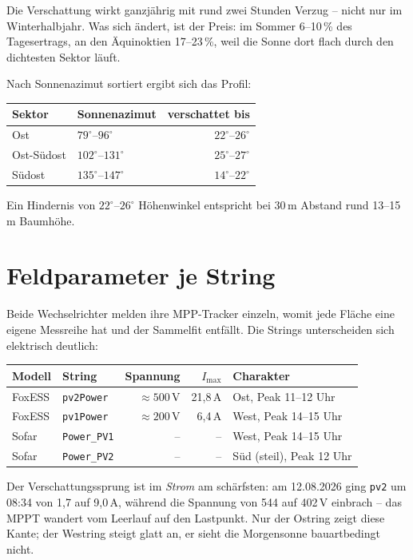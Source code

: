 \documentclass[11pt, a4paper]{article}
\begin{document}
Die Verschattung wirkt ganzjährig mit rund zwei Stunden Verzug -- nicht nur im
Winterhalbjahr. Was sich ändert, ist der Preis: im Sommer 6--10\,\% des
Tagesertrags, an den Äquinoktien 17--23\,\%, weil die Sonne dort flach durch den
dichtesten Sektor läuft.

Nach Sonnenazimut sortiert ergibt sich das Profil:

\begin{center}
\begin{tabular}{llr}
\toprule
Sektor & Sonnenazimut & verschattet bis\\
\midrule
Ost          & $79^\circ$--$96^\circ$   & $22^\circ$--$26^\circ$\\
Ost-Südost   & $102^\circ$--$131^\circ$ & $25^\circ$--$27^\circ$\\
Südost       & $135^\circ$--$147^\circ$ & $14^\circ$--$22^\circ$\\
\bottomrule
\end{tabular}
\end{center}

Ein Hindernis von $22^\circ$--$26^\circ$ Höhenwinkel entspricht bei 30\,m Abstand
rund 13--15\,m Baumhöhe.

\section{Feldparameter je String}

Beide Wechselrichter melden ihre MPP-Tracker einzeln, womit jede Fläche eine
eigene Messreihe hat und der Sammelfit entfällt. Die Strings unterscheiden sich
elektrisch deutlich:

\begin{center}
\begin{tabular}{llrrl}
\toprule
Modell & String & Spannung & $I_{\max}$ & Charakter\\
\midrule
FoxESS & \texttt{pv2Power} & $\approx 500$\,V & 21{,}8\,A & Ost, Peak 11--12 Uhr\\
FoxESS & \texttt{pv1Power} & $\approx 200$\,V & 6{,}4\,A  & West, Peak 14--15 Uhr\\
Sofar  & \texttt{Power\_PV1} & -- & -- & West, Peak 14--15 Uhr\\
Sofar  & \texttt{Power\_PV2} & -- & -- & Süd (steil), Peak 12 Uhr\\
\bottomrule
\end{tabular}
\end{center}

Der Verschattungssprung ist im \emph{Strom} am schärfsten: am 12.08.2026 ging
\texttt{pv2} um 08:34 von 1{,}7 auf 9{,}0\,A, während die Spannung von 544 auf
402\,V einbrach -- das MPPT wandert vom Leerlauf auf den Lastpunkt. Nur der
Ostring zeigt diese Kante; der Westring steigt glatt an, er sieht die
Morgensonne bauartbedingt nicht.
\end{document}

